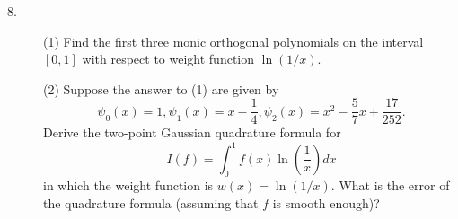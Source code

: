 \documentclass{article}
\begin{document}
\begin{description}
\item[8.]
\item[\quad] (1)
Find the first three monic orthogonal polynomials on the interval $[0,1]$
with respect to weight function $\ln (1/x)$.

\item[\quad] (2)
Suppose the answer to (1) are given by
$$\psi_0 (x) = 1, \psi_1 (x) = x - \frac{1}{4}, \psi_2 (x) = x^2 -
  \frac{5}{7} x + \frac{17}{252}.$$
Derive the two-point Gaussian quadrature formula for
$$I(f) = \int^1_0 f(x) \ln \left(\frac{1}{x} \right) dx$$
in which the weight function is $w(x) = \ln (1/x)$. What is the error of the
quadrature formula (assuming that $f$ is smooth enough)?



\end{description}    
\end{document}
